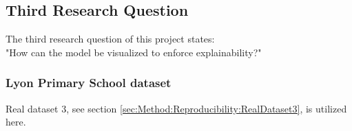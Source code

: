 \subsection{Third Research Question}
\label{sec:ResearchQuestion3}
The third research question of this project states:
\\
"How can the model be visualized to enforce explainability?"



\subsubsection{Lyon Primary School dataset}
\label{sec:ResearchQuestion2:LyonDataset}

Real dataset 3, see section \ref{sec:Method:Reproducibility:RealDataset3}, is utilized here.






